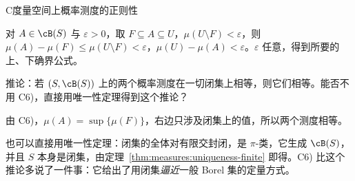 \begin{probleme}{C}{度量空间上概率测度的正则性}
\begin{questions}
\begin{solution}
对 $A\in\cB(S)$ 与 $\varepsilon>0$，取 $F\subseteq A\subseteq U$，$\mu(U\setminus F)<\varepsilon$，则 $\mu(A)-\mu(F)\leqslant\mu(U\setminus F)<\varepsilon$，$\mu(U)-\mu(A)<\varepsilon$。$\varepsilon$ 任意，得到所要的上、下确界公式。
\end{solution}
\item 推论：若 $(S,\cB(S))$ 上的两个概率测度在一切闭集上相等，则它们相等。能否不用 C6)，直接用唯一性定理得到这个推论？
\begin{solution}
由 C6)，$\mu(A)=\sup\{\mu(F)\}$，右边只涉及闭集上的值，所以两个测度相等。

也可以直接用唯一性定理：闭集的全体对有限交封闭，是 $\pi$-类，它生成 $\cB(S)$，并且 $S$ 本身是闭集，由定理~\ref{thm:measures:uniqueness-finite} 即得。C6) 比这个推论多说了一件事：它给出了用闭集\emph{逼近}一般 Borel 集的定量方式。
\end{solution}
\end{questions}
\end{probleme}

\thinkingpart

